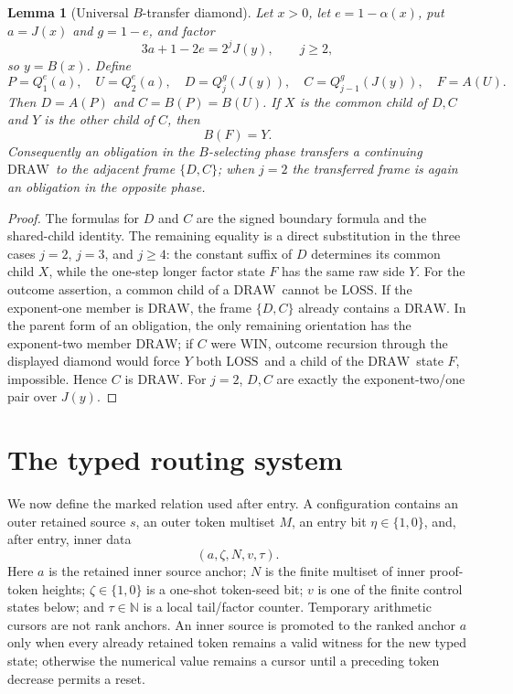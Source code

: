 \documentclass[11pt]{article}
\newtheorem{lemma}[theorem]{Lemma}
\newcommand{\N}{\mathbb N}
\newcommand{\WIN}{\ensuremath{\mathrm{WIN}}}
\newcommand{\LOSS}{\ensuremath{\mathrm{LOSS}}}
\newcommand{\DRAW}{\ensuremath{\mathrm{DRAW}}}
\begin{document}
\begin{lemma}[Universal $B$-transfer diamond]\label{lem:b-diamond}
Let $x>0$, let $e=1-\alpha(x)$, put $a=J(x)$ and $g=1-e$, and factor
\[
  3a+1-2e=2^jJ(y),\qquad j\ge2,
\]
so $y=B(x)$. Define
\[
 P=Q_1^e(a),\quad U=Q_2^e(a),\quad
 D=Q_j^g(J(y)),\quad C=Q_{j-1}^g(J(y)),\quad F=A(U).
\]
Then $D=A(P)$ and $C=B(P)=B(U)$. If $X$ is the common child of $D,C$ and
$Y$ is the other child of $C$, then
\[
  B(F)=Y.
\]
Consequently an obligation in the $B$-selecting phase transfers a continuing
\DRAW\ to the adjacent frame $\{D,C\}$; when $j=2$ the transferred frame is
again an obligation in the opposite phase.
\end{lemma}

\begin{proof}
The formulas for $D$ and $C$ are the signed boundary formula and the
shared-child identity. The remaining equality is a direct substitution in the
three cases $j=2$, $j=3$, and $j\ge4$: the constant suffix of $D$ determines
its common child $X$, while the one-step longer factor state $F$ has the same
raw side $Y$. For the outcome assertion, a common child of a \DRAW\ cannot be
\LOSS. If the exponent-one member is \DRAW, the frame $\{D,C\}$ already
contains a \DRAW. In the parent form of an obligation, the only remaining
orientation has the exponent-two member \DRAW; if $C$ were \WIN, outcome
recursion through the displayed diamond would force $Y$ both \LOSS\ and a
child of the \DRAW\ state $F$, impossible. Hence $C$ is \DRAW. For $j=2$,
$D,C$ are exactly the exponent-two/one pair over $J(y)$.
\end{proof}

\section{The typed routing system}

We now define the marked relation used after entry. A configuration contains
an outer retained source $s$, an outer token multiset $M$, an entry bit
$\eta\in\{1,0\}$, and, after entry, inner data
\[
  (a,\zeta,N,v,\tau).
\]
Here $a$ is the retained inner source anchor; $N$ is the finite multiset of
inner proof-token heights; $\zeta\in\{1,0\}$ is a one-shot token-seed bit;
$v$ is one of the finite control states below; and $\tau\in\N$ is a local
tail/factor counter. Temporary arithmetic cursors are not rank anchors. An inner source is promoted to the ranked anchor $a$ only when every already retained token remains a valid witness for the new typed state; otherwise the numerical value remains a cursor until a preceding token decrease permits a reset.
\end{document}
